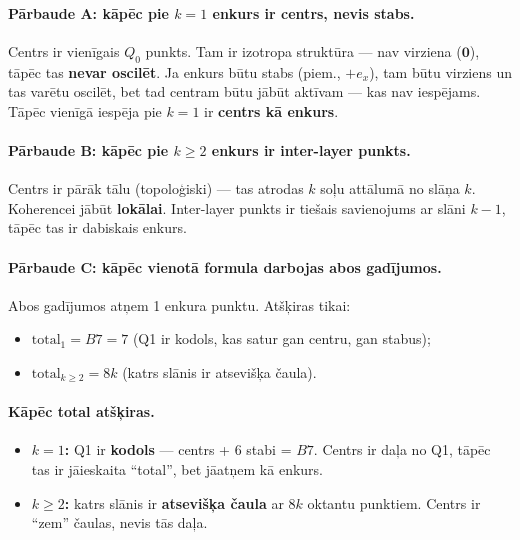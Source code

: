 \documentclass[12pt,a4paper]{article}
\begin{document}
\paragraph{Pārbaude A: kāpēc pie $k=1$ enkurs ir centrs, nevis stabs.}
Centrs ir vienīgais $Q_0$ punkts. Tam ir izotropa struktūra — nav virziena ($\mathbf{0}$), tāpēc tas \textbf{nevar oscilēt}. Ja enkurs būtu stabs (piem., $+e_x$), tam būtu virziens un tas varētu oscilēt, bet tad centram būtu jābūt aktīvam — kas nav iespējams. Tāpēc vienīgā iespēja pie $k=1$ ir \textbf{centrs kā enkurs}.

\paragraph{Pārbaude B: kāpēc pie $k\geq 2$ enkurs ir inter-layer punkts.}
Centrs ir pārāk tālu (topoloģiski) — tas atrodas $k$ soļu attālumā no slāņa $k$. Koherencei jābūt \textbf{lokālai}. Inter-layer punkts ir tiešais savienojums ar slāni $k-1$, tāpēc tas ir dabiskais enkurs.

\paragraph{Pārbaude C: kāpēc vienotā formula darbojas abos gadījumos.}
Abos gadījumos atņem 1 enkura punktu. Atšķiras tikai:
\begin{itemize}
    \item $\text{total}_1 = B7 = 7$ (Q1 ir kodols, kas satur gan centru, gan stabus);
    \item $\text{total}_{k\geq 2} = 8k$ (katrs slānis ir atsevišķa čaula).
\end{itemize}

\paragraph{Kāpēc total atšķiras.}
\begin{itemize}
    \item \textbf{$k=1$:} Q1 ir \textbf{kodols} — centrs + 6 stabi = $B7$. Centrs ir daļa no Q1, tāpēc tas ir jāieskaita ``total'', bet jāatņem kā enkurs.
    \item \textbf{$k\geq 2$:} katrs slānis ir \textbf{atsevišķa čaula} ar $8k$ oktantu punktiem. Centrs ir ``zem'' čaulas, nevis tās daļa.
\end{itemize}
\end{document}
